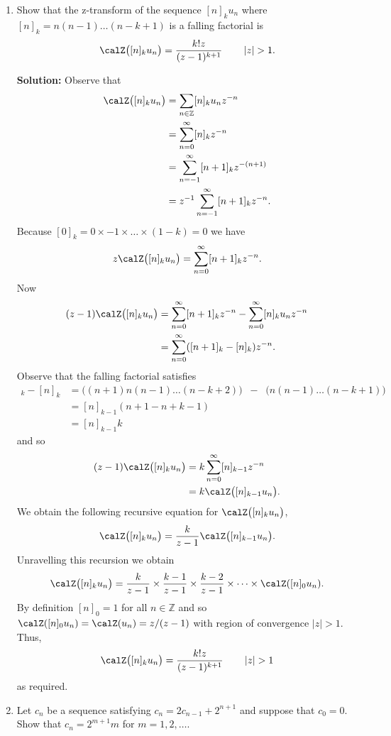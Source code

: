 \documentclass[11pt,a4paper]{book}
\theoremstyle{plain}
\numberwithin{equation}{section}
\newcommand{\ints}{{\mathbb Z}}
\newcommand{\abs}[1]{\left\vert #1 \right\vert}
\newenvironment{solution}{\begin{footnotesize}\textbf{Solution:}}{\end{footnotesize}}
\newenvironment{excersizelist}{%
  \renewcommand*{\theenumi}{\thechapter.\arabic{enumi}}%
  \newcommand\itemadvanced{\stepcounter{enumi}\item[$\ast$\, \theenumi.]}
  \begin{enumerate}
}{%
  \end{enumerate}
}
\begin{document}
\begin{excersizelist}
\item \label{exer:fallingfacztransform} Show that the z-transform of the sequence $[n]_k u_n$ where $[n]_k = n(n-1)\dots(n-k+1)$ is a falling factorial is
\[
\calZ\big( [n]_k u_n  \big) = \frac{k! z }{(z - 1)^{k+1}} \qquad \abs{z} > 1.
\]
\begin{solution}
Observe that
\begin{align*}
\calZ\big( [n]_{k} u_n  \big) &= \sum_{n\in\ints} [n]_k u_n z^{-n} \\ 
&= \sum_{n=0}^\infty [n]_k z^{-n} \\ 
&= \sum_{n=-1}^\infty [n+1]_k z^{-(n+1)} \\
&= z^{-1} \sum_{n=-1}^\infty [n+1]_k z^{-n}.
\end{align*}
Because $[0]_k = 0 \times -1 \times \dots \times (1-k)= 0$ we have
\[
z \calZ\big( [n]_{k} u_n  \big) = \sum_{n=0}^\infty [n+1]_k z^{-n}.
\]  
Now
\begin{align*}
(z - 1) \calZ\big( [n]_{k} u_n  \big) &= \sum_{n=0}^\infty [n+1]_k z^{-n} - \sum_{n=0}^\infty [n]_k u_n z^{-n} \\
&= \sum_{n=0}^\infty ([n+1]_k - [n]_k) z^{-n}.
\end{align*}
Observe that the falling factorial satisfies
\begin{align*}
[n+1]_k - [n]_k &= \big( (n+1)n(n-1)\dots(n-k+2) \big) \;\;  - \;\; \big(n(n-1)\dots(n-k+1)\big) \\
&= [n]_{k-1}(n+1 - n+k-1) \\
&= [n]_{k-1} k
\end{align*}
and so
\begin{align*}
(z - 1) \calZ\big( [n]_{k} u_n  \big) &= k \sum_{n=0}^\infty  [n]_{k-1} z^{-n} \\
&= k \calZ\big( [n]_{k-1} u_n  \big).
\end{align*}
We obtain the following recursive equation for $\calZ\big( [n]_{k} u_n  \big)$,
\[
\calZ\big( [n]_{k} u_n  \big) = \frac{k}{z-1} \calZ\big( [n]_{k-1} u_n  \big).
\]
Unravelling this recursion we obtain
\[
\calZ\big( [n]_{k} u_n  \big) = \frac{k}{z-1} \times \frac{k-1}{z-1} \times \frac{k-2}{z-1} \times \dots \times \calZ( [n]_0 u_n ).
\]
By definition $[n]_0 = 1$ for all $n \in \ints$ and so $\calZ( [n]_0 u_n ) = \calZ( u_n ) = z/(z-1)$ with region of convergence $\abs{z} >1$.  Thus,
\[
\calZ\big( [n]_{k} u_n  \big) = \frac{k! z}{(z-1)^{k+1}} \qquad \abs{z} > 1
\]
as required.
\end{solution}

\item \label{exer:fftcomplexity} Let $c_n$ be a sequence satisfying $c_n = 2 c_{n-1} + 2^{n+1}$ and suppose that $c_0 = 0$.  Show that $c_n = 2^{m+1}m$ for $m = 1,2,\dots$.


\end{excersizelist}
\end{document}
